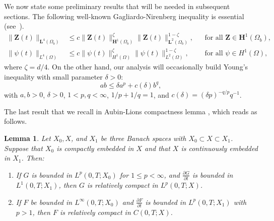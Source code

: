 \documentclass[10pt,number,preprint,times]{elsarticle}
\numberwithin{equation}{section} %
\newtheorem{lem}{Lemma}[section]
\begin{document}
	\noindent  We now state some preliminary results that will be needed in subsequent sections. The following well-known Gagliardo-Nirenberg inequality is essential (see~\cite{ladyvzenskaja1968linear}).
	\begin{align}
		\|\boldsymbol{Z}(t)\|_{\mathbf{L}^{4}(\Omega_b)} &\leq c\|\boldsymbol{Z}(t)\|_{\mathbf{H}^{1}(\Omega_b)}^{\zeta}\|\boldsymbol{Z}(t)\|_{\mathbf{L}^{2}(\Omega_b)}^{1-\zeta}, && \text{for all } \boldsymbol{Z} \in \mathbf{H}^{1}(\Omega_b), \label{Gagliardo-Nirenberg-U} \\
		\|\psi(t)\|_{L^{4}(\Omega)} &\leq c\|\psi(t)\|_{H^{1}(\Omega)}^{\zeta}\|\psi(t)\|_{L^{2}(\Omega)}^{1-\zeta}, && \text{for all } \psi \in H^{1}(\Omega) \label{Gagliardo-Nirenberg-C},
	\end{align}
	where $\zeta = d/4$.
	 On the other hand, our analysis will occasionally build Young's inequality with small parameter $\delta>0$:
	\begin{equation}\label{inq-Young}
		ab \leq \delta a^{p} + c(\delta) b^{q},
	\end{equation}
	with $a, b > 0$, $\delta > 0$, $1 < p, q < \infty$, $1/p + 1/q = 1$, and $c(\delta) = (\delta p)^{-q/p} q^{-1}$.
	
	
The last result that we recall in Aubin-Lions compactness lemma \cite{simon1986compact}, which reads as follows.
	
\begin{lem}\label{lemma-Aubin-Lions} Let $X_0, X$, and $X_1$ be three Banach spaces with $X_0 \subset X \subset X_1$. Suppose that $X_0$ is compactly embedded in $X$ and that $X$ is continuously embedded in $X_1$. Then:
	\begin{enumerate}
		\item 
	 If $G$ is bounded in $L^p\left(0, T ; X_0\right)$ for $1 \leq p<\infty$, and $\frac{\partial G}{\partial t}$ is bounded in $L^1\left(0, T ; X_1\right)$, then $G$ is relatively compact in $L^p(0, T ; X)$.
	\item If $F$ be bounded in $L^{\infty}\left(0, T ; X_0\right)$ and $\frac{\partial F}{\partial t}$ is bounded in $L^p\left(0, T ; X_1\right)$ with $p>1$, then $F$ is relatively compact in $C(0, T ; X)$.
	\end{enumerate}		
	\end{lem}
	
%	
	
\end{document}
